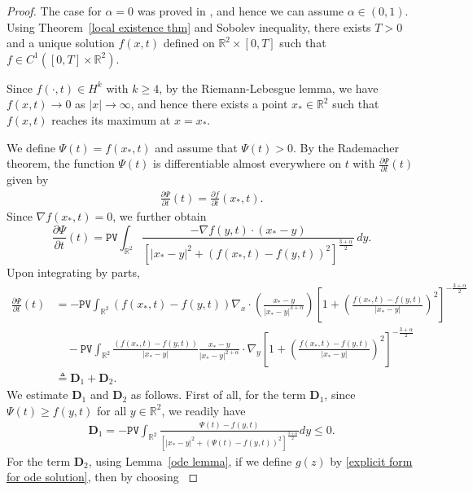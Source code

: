 \documentclass[reqno]{amsart}%
\theoremstyle{definition}
\theoremstyle{remark}
\numberwithin{equation}{section}
\newcommand{\0}{\mathbf{0}}
\newcommand{\1}{\mathbf{1}}
\newcommand{\R}{\mathbb R}
\newcommand{\PV}{\texttt{PV}}
\numberwithin{equation}{section}
\numberwithin{theorem}{section}
\numberwithin{figure}{section}
\begin{document}
\begin{proof}
The case for $\alpha=0$ was proved in \cite{cordoba2009maximum}, and hence we can assume $\alpha\in(0,1)$. Using Theorem~\ref{local existence thm} and Sobolev inequality, there exists $T>0$ and a unique solution $f(x,t)$ defined on $\R^2\times[0,T]$ such that $f\in C^1([0,T]\times\R^2)$. 

Since $f(\cdot,t)\in H^k$ with $k\ge4$, by the Riemann-Lebesgue lemma, we have $f(x,t)\to0$ as $|x|\to\infty$, and hence there exists a point $x_*\in\R^2$ such that $f(x,t)$ reaches its maximum at $x=x_*$.

We define $\Psi(t)=f(x_*,t)$ and assume that $\Psi(t)>0$. By the Rademacher theorem, the function $\Psi(t)$ is differentiable almost everywhere on $t$ with $\frac{\partial\Psi}{\partial t}(t)$ given by
\begin{align*}
\frac{\partial\Psi}{\partial t}(t)=\frac{\partial f}{\partial t}(x_*,t).
\end{align*}
Since $\nabla f(x_*,t) = 0$, we further obtain
\begin{equation*}
\frac{\partial\Psi}{\partial t}(t) = \PV \int_{\mathbb{R}^2} \frac{- \nabla f(y,t) \cdot (x_* - y)}{\left[ |x_* - y|^2 + (f(x_*,t) - f(y,t))^2 \right]^{\frac{3+ \alpha}{2}}} \, dy.
\end{equation*}
Upon integrating by parts,
\begin{align*}
\frac{\partial\Psi}{\partial t}(t) &= - \PV \int_{\mathbb{R}^2} \left( f{(x_*,t)} - f{(y,t)} \right) \nabla_x\cdot\left(\frac{x_*- y}{|x_* - y|^{3+\alpha}} \right) \left[ 1 + \left( \frac{f{(x_*,t)} - f{(y,t)} }{|x_* - y|}\right)^2 \right]^{-\frac{3 + \alpha}{2}}\\
&\quad - \PV \int_{\mathbb{R}^2} \frac{\left( f{(x_*,t)} - f{(y,t)} \right)}{|x_* - y|}\frac{x_* - y}{|x_* - y|^{2+\alpha}} \cdot\nabla_y \left[ 1 + \left( \frac{f{(x_*,t)} - f{(y,t)} }{|x_* - y|}\right)^2 \right]^{-\frac{3 + \alpha}{2}}\\
&\triangleq \mathbf{D}_1+\mathbf{D}_2.
\end{align*}
We estimate $\mathbf{D}_1$ and $\mathbf{D}_2$ as follows. First of all, for the term $\mathbf{D}_1$, since $\Psi(t)\ge f(y,t)$ for all $y\in\R^2$, we readily have
\begin{align*}
\mathbf{D}_{1} = - \PV \int_{\mathbb{R}^2} \frac{\Psi(t) - f(y,t)}{\left[ \left|x_* - y\right|^{2} + \left(\Psi(t) - f(y,t)\right)^{2}\right]^{\frac{3 + \alpha}{2}}}dy\le 0.
\end{align*}
{For the term $\mathbf{D}_{2}$, using Lemma~\ref{ode lemma}, if we define $g(z)$ by \eqref{explicit form for ode solution}, then by choosing 
}
\end{proof}
\end{document}
